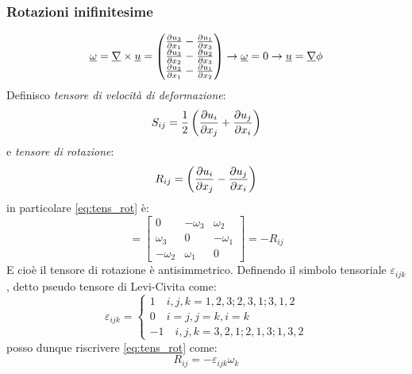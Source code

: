 \subsubsection{Rotazioni inifinitesime}
\begin{equation}
  \label{eq:rotazioni_infinitesime}
  \underline{\omega}=\underline{\nabla}\times \underline{u}=
  \begin{pmatrix}
    \frac{\partial u_3}{\partial x_1}-\frac{\partial u_1}{\partial x_3}\\
    \frac{\partial u_3}{\partial x_2}-\frac{\partial u_2}{\partial x_3}\\
    \frac{\partial u_2}{\partial x_1}-\frac{\partial u_1}{\partial x_2}
  \end{pmatrix}\to
  \underline{\omega}=0 \to \underline{u}=\underline{\nabla}\phi 
\end{equation}
Definisco \emph{tensore di velocità di deformazione}:
\begin{equation}
  \label{eq:tens_vel_defo}
  S_{ij} = \frac{1}{2} \left(\frac{\partial u_i}{\partial x_j}+\frac{\partial u_j}{\partial x_i}\right)
\end{equation}
e \emph{tensore di rotazione}:
\begin{equation}
  \label{eq:tens_rot}
  R_{ij}= \left(\frac{\partial u_i}{\partial x_j}-\frac{\partial u_j}{\partial x_i}\right)
\end{equation}
in particolare \cref{eq:tens_rot} è:
\begin{equation*}
  =\begin{bmatrix}
    0 & -\omega_3 & \omega_2\\
    \omega_3 & 0 & -\omega_1\\
    -\omega_2 & \omega_1 & 0
  \end{bmatrix} = -R_{ij}
\end{equation*}
E cioè il tensore di rotazione è antisimmetrico.
Definendo il simbolo tensoriale $ \varepsilon_{ijk}  $, detto pseudo tensore di Levi-Civita come:
\begin{equation}
  \label{eq:e_ijk}
  \varepsilon_{ijk} =
  \begin{cases}
    1 \quad i,j,k = 1,2,3;2,3,1;3,1,2\\
    0 \quad i=j,j=k,i=k\\
    -1 \quad i,j,k = 3,2,1;2,1,3;1,3,2
  \end{cases}
\end{equation}
posso dunque riscrivere \cref{eq:tens_rot} come:
\begin{equation}
  R_{ij} = - \varepsilon_{ijk} \omega_k
\end{equation}
